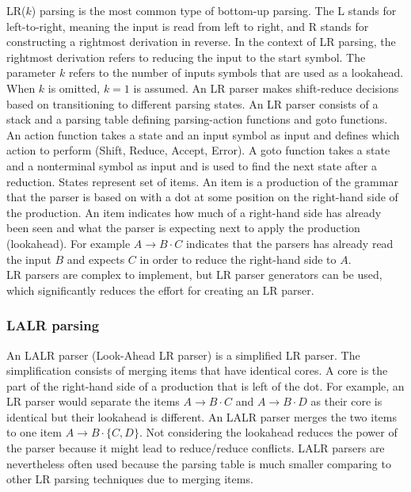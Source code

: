 LR($k$) parsing is the most common type of bottom-up parsing. The L stands for left-to-right, meaning the input is read from left to right, and R stands for constructing a rightmost derivation in reverse.
In the context of LR parsing, the rightmost derivation refers to reducing the input to the start symbol.
The parameter $k$ refers to the number of inputs symbols that are used as a lookahead. When $k$ is omitted, $k = 1$ is assumed.
An LR parser makes shift-reduce decisions based on transitioning to different parsing states.
An LR parser consists of a stack and a parsing table defining parsing-action functions and goto functions.
An action function takes a state and an input symbol as input and defines which action to perform (Shift, Reduce, Accept, Error).
A goto function takes a state and a nonterminal symbol as input and is used to find the next state after a reduction.
States represent set of items.
An item is a production of the grammar that the parser is based on with a dot at some position on the right-hand side of the production.
An item indicates how much of a right-hand side has already been seen and what the parser is expecting next to apply the production (lookahead).
For example $A \rightarrow B\cdot C$ indicates that the parsers has already read the input $B$ and expects $C$ in order to reduce the right-hand side to $A$.\cite{Aho.2007}\\
LR parsers are complex to implement, but LR parser generators can be used, which significantly reduces the effort for creating an LR parser.
\cite{Aho.2007}

\subsubsection{LALR parsing}\label{sec:BackgroundParserLALR}

An LALR parser (Look-Ahead LR parser) is a simplified LR parser.
The simplification consists of merging items that have identical cores.
A core is the part of the right-hand side of a production that is left of the dot. 
For example, an LR parser would separate the items $A \rightarrow B\cdot C$ and $A \rightarrow B\cdot D$ as their core is identical but their lookahead is different.
An LALR parser merges the two items to one item
$A \rightarrow B\cdot \{C,D\}$.
Not considering the lookahead reduces the power of the parser because it might lead to reduce/reduce conflicts.
LALR parsers are nevertheless often used because the parsing table is much smaller comparing to other LR parsing techniques  due to merging items.
\cite{Aho.2007}


